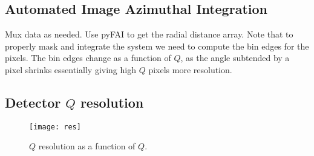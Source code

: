 \subsection{Automated Image Azimuthal Integration}
Mux data as needed. 
Use pyFAI to get the radial distance array.
Note that to properly mask and integrate the system we need to compute the bin edges for the pixels.
The bin edges change as a function of $Q$, as the angle subtended by a pixel shrinks essentially giving high $Q$ pixels more resolution.

\subsection{Detector $Q$ resolution} \label{subsec:qres}
\begin{figure}[!ht]
  \texttt{[image: res]}
\caption{$Q$ resolution as a function of $Q$.}
\end{figure}


